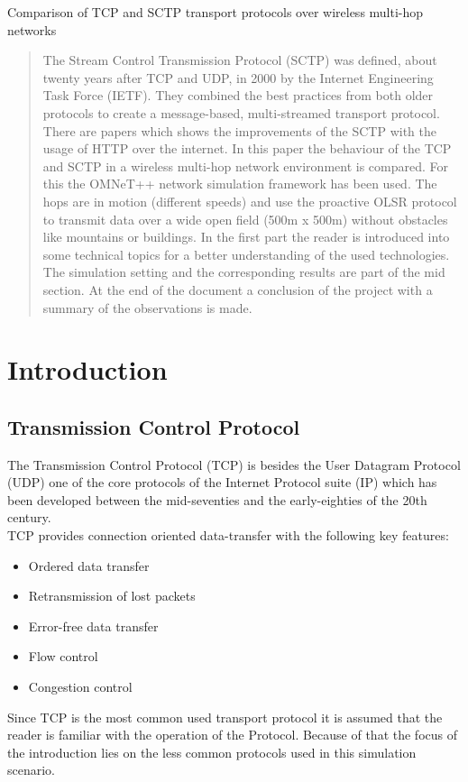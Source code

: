 \documentclass[a4paper]{article}
\begin{document}
 
 

\begin{center}
	\huge{Comparison of TCP and SCTP transport protocols over wireless multi-hop networks}
\end{center}

\begin{abstract}
The Stream Control Transmission Protocol (SCTP) was defined, about twenty years after TCP and UDP, in 2000 by the Internet Engineering Task Force (IETF). They combined the best practices from both older protocols to create a message-based, multi-streamed transport protocol. There are papers \cite{sctp_vs_tcp}\cite{sctp_vs_tcp2} which shows the improvements of the SCTP with the usage of HTTP over the internet. In this paper the behaviour of the TCP and SCTP in a wireless multi-hop network environment is compared. For this the OMNeT++ network simulation framework \cite{omnetpp} has been used. The hops are in motion (different speeds) and use the proactive OLSR protocol to transmit data over a wide open field (500m x 500m) without obstacles like mountains or buildings. In the first part the reader is introduced into some technical topics for a better understanding of the used technologies. The simulation setting and the corresponding results are part of the mid section. At the end of the document a conclusion of the project with a summary of the observations is made.
\end{abstract}

\tableofcontents
\pagebreak

\section{Introduction}

\subsection{Transmission Control Protocol}

The Transmission Control Protocol (TCP) is besides the User Datagram Protocol (UDP) one of the core protocols of the Internet Protocol suite (IP) which has been developed between the mid-seventies and the early-eighties of the 20th century.\\
TCP provides connection oriented data-transfer with the following key features:
\begin{itemize}
	\item Ordered data transfer
	\item Retransmission of lost packets
	\item Error-free data transfer 
	\item Flow control 
	\item Congestion control
\end{itemize}
Since TCP is the most common used transport protocol it is assumed that the reader is familiar with the operation of the Protocol. Because of that the focus of the introduction lies on the less common protocols used in this simulation scenario.
\end{document}
